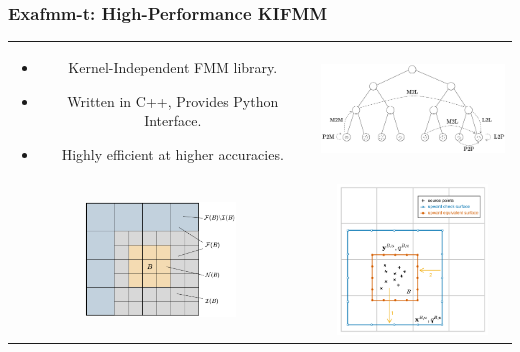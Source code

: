 \documentclass[dvipsnames,10pt]{beamer}
\begin{document}
\begin{frame}
    \frametitle{Exafmm-t: High-Performance KIFMM}
    \vspace{-.1cm}
    \begin{center}
        \begin{tabular}{cc}
            \begin{minipage}{5cm}
                \begin{itemize}
                    \item Kernel-Independent FMM library.
                    \item Written in C++, Provides Python Interface.
                    \item Highly efficient at higher accuracies.
                \end{itemize}
            \end{minipage} &
            \includegraphics[width=5cm]{../figs/fmm_sketch.pdf} \\
            \includegraphics[width=4cm]{../figs/near_far_decomposition.pdf} &
            \includegraphics[width=4cm]{../figs/multipole_expansion.pdf}
        \end{tabular}
    \end{center}

\end{frame}
    
\end{document}
